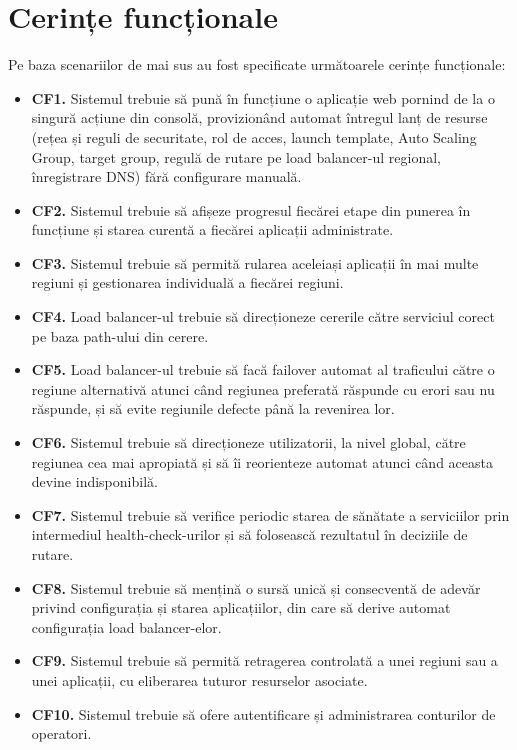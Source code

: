\documentclass[12pt,a4paper]{report}
\begin{document}
\section{Cerințe funcționale}
Pe baza scenariilor de mai sus au fost specificate următoarele cerințe funcționale:

\begin{itemize}
	\item \textbf{CF1.} Sistemul trebuie să pună în funcțiune o aplicație web pornind de la o singură acțiune din consolă, provizionând automat întregul lanț de resurse (rețea și reguli de securitate, rol de acces, launch template, Auto Scaling Group, target group, regulă de rutare pe load balancer-ul regional, înregistrare DNS) fără configurare manuală.
	\item \textbf{CF2.} Sistemul trebuie să afișeze progresul fiecărei etape din punerea în funcțiune și starea curentă a fiecărei aplicații administrate.
	\item \textbf{CF3.} Sistemul trebuie să permită rularea aceleiași aplicații în mai multe regiuni și gestionarea individuală a fiecărei regiuni.
	\item \textbf{CF4.} Load balancer-ul trebuie să direcționeze cererile către serviciul corect pe baza path-ului din cerere.
	\item \textbf{CF5.} Load balancer-ul trebuie să facă failover automat al traficului către o regiune alternativă atunci când regiunea preferată răspunde cu erori sau nu răspunde, și să evite regiunile defecte până la revenirea lor.
	\item \textbf{CF6.} Sistemul trebuie să direcționeze utilizatorii, la nivel global, către regiunea cea mai apropiată și să îi reorienteze automat atunci când aceasta devine indisponibilă.
	\item \textbf{CF7.} Sistemul trebuie să verifice periodic starea de sănătate a serviciilor prin intermediul health-check-urilor și să folosească rezultatul în deciziile de rutare.
	\item \textbf{CF8.} Sistemul trebuie să mențină o sursă unică și consecventă de adevăr privind configurația și starea aplicațiilor, din care să derive automat configurația load balancer-elor.
	\item \textbf{CF9.} Sistemul trebuie să permită retragerea controlată a unei regiuni sau a unei aplicații, cu eliberarea tuturor resurselor asociate.
	\item \textbf{CF10.} Sistemul trebuie să ofere autentificare și administrarea conturilor de operatori.
\end{itemize}
\end{document}
